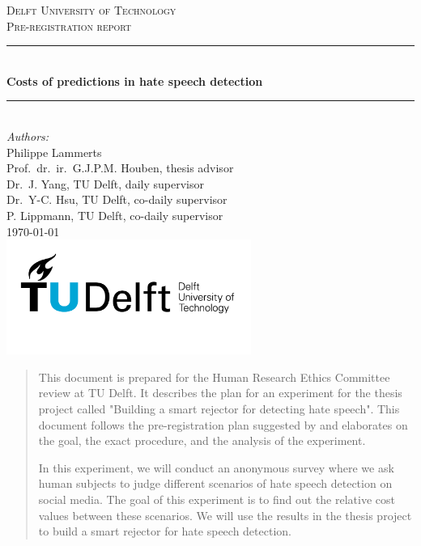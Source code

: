 \documentclass[a4paper]{article}
\begin{document}
\begin{titlepage}

    \newcommand{\HRule}{\rule{\linewidth}{0.5mm}} 							%
    \center

    \textsc{\LARGE Delft University of Technology}\\[1cm]

    \textsc{\Large Pre-registration report}\\[0.2cm]
    \HRule \\[0.8cm]
    { \huge \bfseries Costs of predictions in hate speech detection}\\[0.7cm]								%
    \HRule \\[2cm]
    \large
    \emph{Authors:}\\
    Philippe Lammerts\\
    Prof.\ dr.\ ir.\ G.J.P.M. Houben, thesis advisor \\
    Dr.\ J. Yang, TU Delft, daily supervisor \\
    Dr.\ Y-C. Hsu, TU Delft, co-daily supervisor\\
    P. Lippmann, TU Delft, co-daily supervisor\\

    {\large \today}\\[5cm]
    \includegraphics[width=0.6\textwidth]{images/TU_delft_logo.jpg}\\[1cm] 	%
    \vfill
\end{titlepage}

\begin{abstract}
    This document is prepared for the Human Research Ethics Committee review at TU Delft. It describes the plan for an experiment for the thesis project called "Building a smart rejector for detecting hate speech". This document follows the pre-registration plan suggested by \cite{van2016pre} and elaborates on the goal, the exact procedure, and the analysis of the experiment.

    In this experiment, we will conduct an anonymous survey where we ask human subjects to judge different scenarios of hate speech detection on social media. The goal of this experiment is to find out the relative cost values between these scenarios. We will use the results in the thesis project to build a smart rejector for hate speech detection.
\end{abstract}
\end{document}
